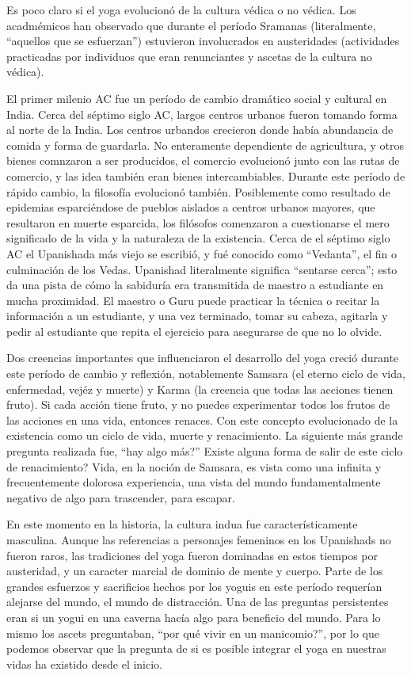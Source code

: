 Es poco claro si el yoga evolucionó de la cultura v\'edica o no v\'edica. Los acadm\'emicos han observado que durante el período Sramanas (literalmente, ``aquellos que se esfuerzan'') estuvieron involucrados en austeridades (actividades practicadas por individuos que eran renunciantes y ascetas de la cultura no v\'edica).

El primer milenio AC fue un período de cambio dramático social y cultural en India. Cerca del s\'eptimo siglo AC, largos centros urbanos fueron tomando forma al norte de la India. Los centros urbandos crecieron donde había abundancia de comida y forma de guardarla. No enteramente dependiente de agricultura, y otros bienes comnzaron a ser producidos, el comercio evolucionó junto con las rutas de comercio, y las idea tambi\'en eran bienes intercambiables. Durante este período de rápido cambio, la filosofía evolucionó tambi\'en. Posiblemente como resultado de epidemias esparci\'endose de pueblos aislados a centros urbanos mayores, que resultaron en muerte esparcida, los filósofos comenzaron a cuestionarse el mero significado de la vida y la naturaleza de la existencia. Cerca de el s\'eptimo siglo AC el Upanishada más viejo se escribió, y fu\'e conocido como ``Vedanta'', el fin o culminación de los Vedas. Upanishad literalmente significa ``sentarse cerca''; esto da una pista de cómo la sabiduría era transmitida de maestro a estudiante en mucha proximidad. El maestro o Guru puede practicar la t\'ecnica o recitar la información a un estudiante, y una vez terminado, tomar su cabeza, agitarla y pedir al estudiante que repita el ejercicio para asegurarse de que no lo olvide.

Dos creencias importantes que influenciaron el desarrollo del yoga creció durante este período de cambio y reflexión, notablemente Samsara (el eterno ciclo de vida, enfermedad, vej\'ez y muerte) y Karma (la creencia que todas las acciones tienen fruto). Si cada acción tiene fruto, y no puedes experimentar todos los frutos de las acciones en una vida, entonces renaces. Con este concepto evolucionado de la existencia como un ciclo de vida, muerte y renacimiento. La siguiente más grande pregunta realizada fue, ``hay algo más?'' Existe alguna forma de salir de este ciclo de renacimiento? Vida, en la noción de Samsara, es vista como una infinita y frecuentemente dolorosa experiencia, una vista del mundo fundamentalmente negativo de algo para trascender, para escapar.

En este momento en la historia, la cultura indua fue característicamente masculina. Aunque las referencias a personajes femeninos en los Upanishads no fueron raros, las tradiciones del yoga fueron dominadas en estos tiempos por austeridad, y un caracter marcial de dominio de mente y cuerpo. Parte de los grandes esfuerzos y sacrificios hechos por los yoguis en este período requerían alejarse del mundo, el mundo de distracción. Una de las preguntas persistentes eran si un yogui en una caverna hacía algo para beneficio del mundo. Para lo mismo los ascets preguntaban, ``por qu\'e vivir en un manicomio?'', por lo que podemos observar que la pregunta de si es posible integrar el yoga en nuestras vidas ha existido desde el inicio.

